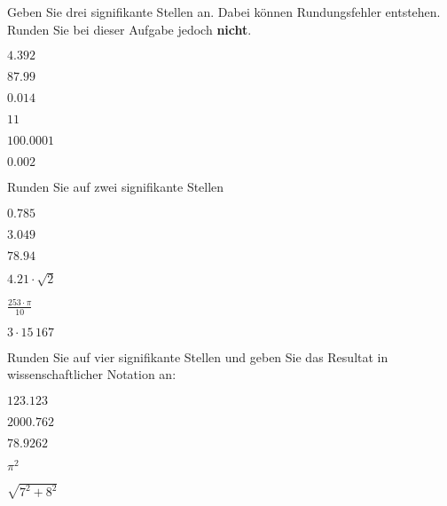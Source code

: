 \platzFuerBerechnungenBisEndeSeite{}
\TRAINER{\newpage}

Geben Sie drei signifikante Stellen an. Dabei können
Rundungsfehler entstehen. Runden Sie bei dieser Aufgabe jedoch \textbf{nicht}.

\begin{bbwAufgabenBlock}
\item $4.392$ 
\item $87.99$ 
\item $0.014$ 
\item $11$ 
\item $100.0001$ 
\item $0.002$ 
\end{bbwAufgabenBlock}

\platzFuerBerechnungenBisEndeSeite{}

Runden Sie auf zwei signifikante Stellen

\begin{bbwAufgabenBlock}
\item $0.785$ 
\item $3.049$ 
\item $78.94$ 
\item $4.21\cdot{}\sqrt{2}$ 
\item $\frac{253\cdot{}\pi}{10}$ 
\item $3\cdot{}15\,167$ 
\end{bbwAufgabenBlock}

\platzFuerBerechnungenBisEndeSeite{}

Runden Sie auf vier signifikante Stellen und geben Sie das Resultat in
wissenschaftlicher Notation an:

\begin{bbwAufgabenBlock}
\item $123.123$ 
\item $2000.762$ 
\item $78.9262$ 
\item $\pi^2$ 
\item $\sqrt{7^2+8^2}$ 
\end{bbwAufgabenBlock}

\platzFuerBerechnungenBisEndeSeite{}
\TRAINER{\newpage}




